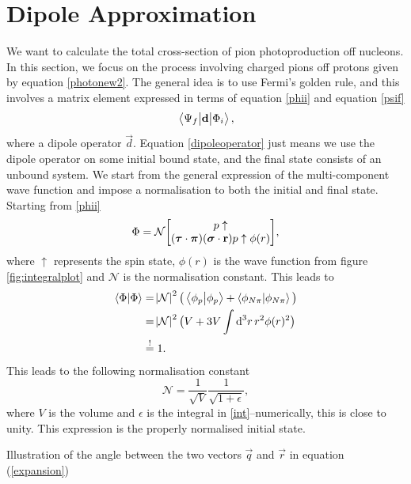 \section{Dipole Approximation}\label{sec:dipoleapprox}
We want to calculate the total cross-section of pion photoproduction off nucleons. In this section, we focus on the process involving charged pions off protons given by equation \eqref{photonew2}. The general idea is to use Fermi's golden rule, and this involves a matrix element expressed in terms of equation \eqref{phii} and equation \eqref{psif}
\begin{equation}\label{dipoleoperator}
	\mel{\Psi_f}{\bm{\mathrm{d}}}{\Phi_i},
\end{equation}
where a dipole operator $\vec{d}$. Equation \eqref{dipoleoperator} just means we use the dipole operator on some initial bound state, and the final state consists of an unbound system. We start from the general expression of the multi-component wave function and impose a normalisation to both the initial and final state. Starting from \eqref{phii}
\begin{align}\label{finalphi}
	\Phi = \mathcal{N} \mqty[p\uparrow \\ (\vec{\tau}\cdot \vec{\pi})(\vec{\sigma}\cdot \vec{r})p\uparrow \phi(r)],
\end{align}
where $\uparrow$ represents the spin state, $\phi(r)$ is the wave function from figure \ref{fig:integralplot} and $\mathcal{N}$ is the normalisation constant. This leads to
\begin{align}
	\braket{\Phi}{\Phi} &= \abs{\mathcal{N}}^2 \big( \braket{\phi_p}{\phi_p}+ \braket{\phi_{N\pi}}{\phi_{N\pi}} \big) \\
	&= \abs{\mathcal{N}}^2 \big( V+3V\int \text{d}^3r \, r^2 \phi(r)^2 \big)\label{int} \\
	&\stackrel{!}{=} 1.
\end{align} 
This leads to the following normalisation constant
\begin{equation}
	\mathcal{N} = \frac{1}{\sqrt{V}}\frac{1}{\sqrt{1+\epsilon}},
\end{equation}
where $V$ is the volume and $\epsilon$ is the integral in \eqref{int}--numerically, this is close to unity. This expression is the properly normalised initial state. 
\begin{marginfigure}
	\centering
	
	\caption{Illustration of the angle between the two vectors $\vec{q}$ and $\vec{r}$ in equation (\ref{expansion})}
	\label{normsphere}
\end{marginfigure}
